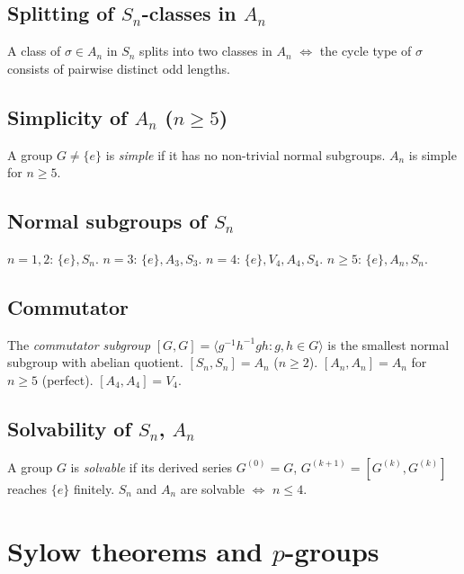 \subsection{Splitting of $S_n$-classes in $A_n$}
\label{subsec:splitting-classes}

A class of $\sigma\in A_n$ in $S_n$ splits into two classes in $A_n$ $\Leftrightarrow$ the cycle type of $\sigma$ consists of pairwise distinct odd lengths.

\subsection{Simplicity of $A_n$ ($n\ge5$)}
\label{subsec:simplicity-an}

A group $G\neq\{e\}$ is \textit{simple} if it has no non-trivial normal subgroups. $A_n$ is simple for $n\ge5$.

\subsection{Normal subgroups of $S_n$}
\label{subsec:normal-sn}

$n=1,2$: $\{e\},S_n$. $n=3$: $\{e\},A_3,S_3$. $n=4$: $\{e\},V_4,A_4,S_4$. $n\ge5$: $\{e\},A_n,S_n$.

\subsection{Commutator}
\label{subsec:commutator-sn}

The \textit{commutator subgroup} $[G,G]=\langle g^{-1}h^{-1}gh:g,h\in G\rangle$ is the smallest normal subgroup with abelian quotient. $[S_n,S_n]=A_n$ ($n\ge2$). $[A_n,A_n]=A_n$ for $n\ge5$ (perfect). $[A_4,A_4]=V_4$.

\subsection{Solvability of $S_n$, $A_n$}
\label{subsec:solvability-sn}

A group $G$ is \textit{solvable} if its derived series $G^{(0)}=G$, $G^{(k+1)}=[G^{(k)},G^{(k)}]$ reaches $\{e\}$ finitely. $S_n$ and $A_n$ are solvable $\Leftrightarrow$ $n\le4$.

\medskip

\section{Sylow theorems and $p$-groups}
\label{sec:sylow}

